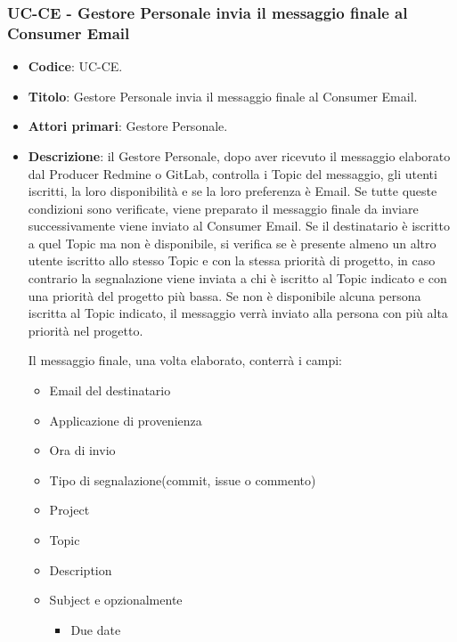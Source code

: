 \subsubsection{UC\theuccount-CE - Gestore Personale invia il messaggio finale al Consumer Email}
	\begin{itemize}
		\item \textbf{Codice}: UC\theuccount-CE.
		\item \textbf{Titolo}: Gestore Personale invia il messaggio finale al Consumer Email.
		\item \textbf{Attori primari}: Gestore Personale.
		\item \textbf{Descrizione}: il Gestore Personale, dopo aver ricevuto il messaggio elaborato
		dal Producer Redmine o GitLab, controlla i Topic del messaggio, gli utenti iscritti, la loro disponibilità e se la loro preferenza è Email.
		Se tutte queste condizioni sono verificate, viene preparato il messaggio finale da inviare successivamente viene inviato al Consumer Email. 
		Se il destinatario è iscritto a quel Topic ma non è disponibile, si verifica se è presente almeno un altro utente iscritto allo stesso Topic e con la stessa priorità di progetto, in caso contrario la segnalazione viene inviata a chi è iscritto al Topic indicato e con una priorità del progetto più bassa. Se non è disponibile alcuna persona iscritta al Topic indicato, il messaggio verrà inviato alla persona con più alta priorità nel progetto. \par
		Il messaggio finale, una volta elaborato, conterrà i campi:
		\begin{itemize}
			\item Email del destinatario
			\item Applicazione di provenienza
			\item Ora di invio
			\item Tipo di segnalazione(commit, issue o commento)
			\item Project
			\item Topic
			\item Description
			\item Subject e opzionalmente
		 	\begin{itemize}
				\item Due date

\end{itemize}
\end{itemize}
\end{itemize}
